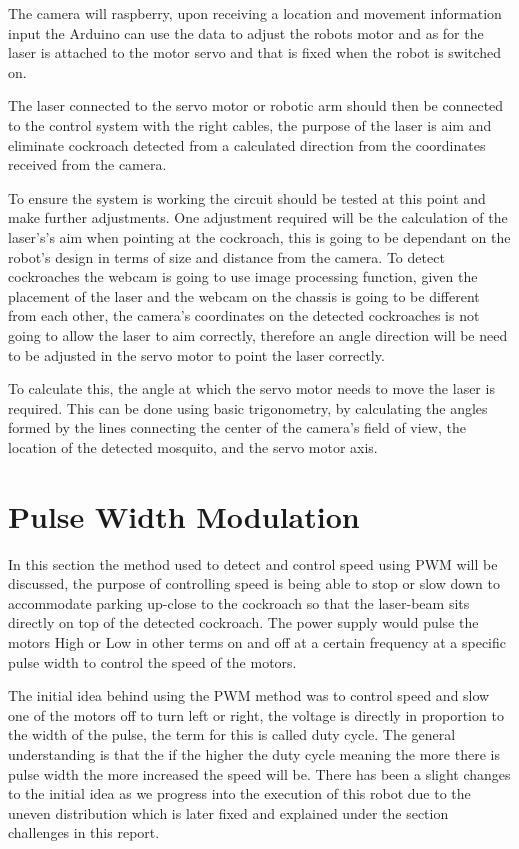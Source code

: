 \documentclass[11pt]{article}
\begin{document}
	
	The camera will raspberry, upon receiving a location and movement information input the Arduino can use the data to adjust the robots motor and as for the laser is attached to the motor servo and that is fixed when the robot is switched on.
	

	
	
	The laser connected to the servo motor or robotic arm should then be connected to the control system with the right cables, the purpose of the laser is aim and eliminate cockroach detected from a calculated direction from the coordinates received from the camera.
	
	To ensure the system is working the circuit should be tested at this point and make further adjustments.
	One adjustment required will be the calculation of the laser's's aim when pointing at the cockroach, this is going to be dependant on the robot's design in terms of size and distance from the camera. To detect cockroaches the webcam is going to use image processing function, given the placement of the laser and the webcam  on the chassis is going to be different from each other, the camera's coordinates on the detected cockroaches is not going to allow the laser to aim correctly, therefore an angle direction will be need to be adjusted in the servo motor to point the laser correctly.
	
	
	To calculate this, the angle at which the servo motor needs to move the laser is required. This can be done using basic trigonometry, by calculating the angles formed by the lines connecting the center of the camera's field of view, the location of the detected mosquito, and the servo motor axis.
	

		\section{Pulse Width Modulation} \label{Tcp}
		
		\label{pwm-weight-section}
	
	In this section the method used to detect and control speed using PWM will be discussed, the purpose of controlling speed is being able to stop or slow down to accommodate parking up-close to the cockroach so that the laser-beam sits directly on top of the detected cockroach. The power supply would pulse the motors  High or Low in other terms on and off at a certain frequency at a specific pulse width to control the speed of the motors.
	
	The initial idea behind using the PWM method was to control speed and slow one of the motors off to turn left or right, the voltage is directly in proportion to the width of the pulse, the term for this is called duty cycle. The general understanding is that the if the higher the duty cycle meaning the more there is pulse width the more increased the speed will be. There has been a  slight changes to the initial idea as we progress into the execution of this robot due to the uneven distribution which is later fixed and explained under the section challenges in this report.
	
\end{document}
